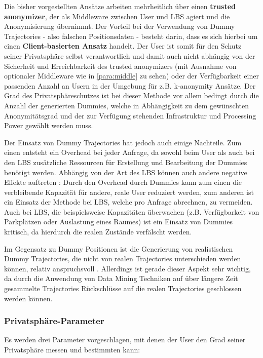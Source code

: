 Die bisher vorgestellten Ansätze arbeiten mehrheitlich über einen \textbf{trusted anonymizer}, der als Middleware zwischen User und LBS agiert und die Anonymisierung übernimmt. Der Vorteil bei der Verwendung von Dummy Trajectories - also falschen Positionsdaten - besteht darin, dass es sich hierbei um einen \textbf{Client-basierten Ansatz} handelt. Der User ist somit für den Schutz seiner Privatsphäre selbst verantwortlich und damit auch nicht abhängig von der Sicherheit und Erreichbarkeit des trusted anonymizers (mit Ausnahme von optionaler Middleware wie in \ref{para:middle} zu sehen) oder der Verfügbarkeit einer passenden Anzahl an Usern in der Umgebung für z.B. k-anonymity Ansätze. Der Grad des Privatsphäreschutzes ist bei dieser Methode vor allem bedingt durch die Anzahl der generierten Dummies, welche in Abhängigkeit zu dem gewünschten Anonymitätsgrad und der zur Verfügung stehenden Infrastruktur und Processing Power gewählt werden muss.

Der Einsatz von Dummy Trajectories hat jedoch auch einige Nachteile. Zum einen entsteht ein Overhead bei jeder Anfrage, da sowohl beim User als auch bei den LBS zusätzliche Ressourcen für Erstellung und Bearbeitung der Dummies benötigt werden. Abhängig von der Art des LBS können auch andere negative Effekte auftreten \cite{Beresford2005}: Durch den Overhead durch Dummies kann zum einen die verbleibende Kapazität für andere, reale User reduziert werden, zum anderen ist ein Einsatz der Methode bei LBS, welche pro Anfrage abrechnen, zu vermeiden. Auch bei LBS, die beispielsweise Kapazitäten überwachen (z.B. Verfügbarkeit von Parkplätzen oder Auslastung eines Raumes) ist ein Einsatz von Dummies kritisch, da hierdurch die realen Zustände verfälscht werden.

Im Gegensatz zu Dummy Positionen ist die Generierung von realistischen Dummy Trajectories, die nicht von realen Trajectories unterschieden werden können, relativ anspruchsvoll \cite{Beresford2003}. Allerdings ist gerade dieser Aspekt sehr wichtig, da durch die Anwendung von Data Mining Techniken auf über längere Zeit gesammelte Trajectories Rückschlüsse auf die realen Trajectories geschlossen werden können. 

\subsubsection{Privatsphäre-Parameter \cite{You2007, Lei2012}} \label{subsubsection:dgparameter}
Es werden drei Parameter vorgeschlagen, mit denen der User den Grad seiner Privatsphäre messen und bestimmten kann:
